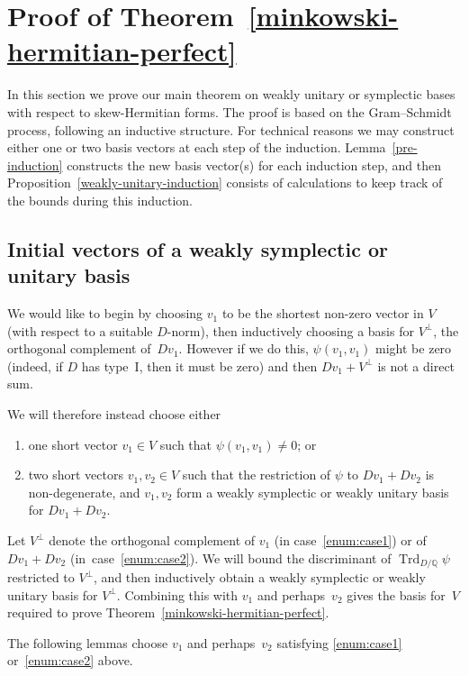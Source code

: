 \documentclass[JEP,XML,SOM,Unicode,NoFloatCountersInSection]{cedram}
\newcommand{\bQ}{\mathbb{Q}}
\DeclareMathOperator{\Trd}{Trd}
\begin{document}
\section{Proof of Theorem~\ref{minkowski-hermitian-perfect}} \label{sec:minkowski-proof}

In this section we prove our main theorem on weakly unitary or symplectic bases with respect to skew-Hermitian forms.
The proof is based on the Gram--Schmidt process, following an inductive structure.
For technical reasons we may construct either one or two basis vectors at each step of the induction.
Lemma~\ref{pre-induction} constructs the new basis vector(s) for each induction step, and then Proposition~\ref{weakly-unitary-induction} consists of calculations to keep track of the bounds during this induction.

\subsection{Initial vectors of a weakly symplectic or unitary basis}

We would like to begin by choosing $v_1$ to be the shortest non-zero vector in $V$ (with respect to a suitable $D$-norm), then inductively choosing a basis for $V^\perp$, the orthogonal complement of~$Dv_1$.
However if we do this, $\psi(v_1, v_1)$ might be zero (indeed, if $D$ has type~I, then it must be zero) and then $Dv_1 + V^\perp$ is not a direct sum.

We will therefore instead choose either
\begin{enumerate}
\item\label{enum:case1} one short vector $v_1 \in V$ such that $\psi(v_1, v_1) \neq 0$; or
\item\label{enum:case2} two short vectors $v_1, v_2 \in V$ such that the restriction of $\psi$ to $Dv_1 + Dv_2$ is non-degenerate, and $v_1, v_2$ form a weakly symplectic or weakly unitary basis for $Dv_1 + Dv_2$.
\end{enumerate}

Let $V^\perp$ denote the orthogonal complement of $v_1$ (in case~\eqref{enum:case1}) or of $Dv_1 + Dv_2$ (in~case~\eqref{enum:case2}).
We will bound the discriminant of $\Trd_{D/\bQ} \psi$ restricted to $V^\perp$, and then inductively obtain a weakly symplectic or weakly unitary basis for $V^\perp$.
Combining this with $v_1$ and perhaps~$v_2$ gives the basis for~$V$ required to prove Theorem~\ref{minkowski-hermitian-perfect}.

The following lemmas choose $v_1$ and perhaps~$v_2$ satisfying \eqref{enum:case1} or~\eqref{enum:case2} above.
\end{document}
